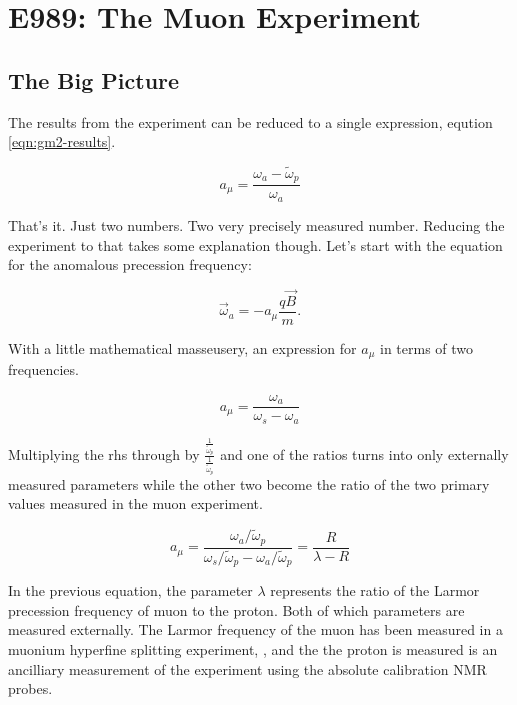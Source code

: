 \chapter {E989: The Muon \gmtwo Experiment}

\section{The Big Picture}

The results from the \gmtwo experiment can be reduced to a single expression, eqution \ref{eqn:gm2-results}.

\begin{equation}
\label{eqn:gm2-results}
a_\mu = \frac{\omega_a - \tilde{\omega}_p}{\omega_a}
\end{equation}

That's it.  Just two numbers. Two very precisely measured number.  Reducing the experiment to that takes some explanation though.  Let's start with the equation for the anomalous precession frequency:

\begin{equation}
\label{eqn:a-mu-precession-0}
\vec{\omega}_a = -a_\mu \frac{q \vec{B}}{m}.
\end{equation}

\noindent
With a little mathematical masseusery, an expression for $a_\mu$ in terms of two frequencies.

\begin{equation}
\label{eqn:a-mu-precession-1}
a_\mu = \frac{\omega_a}{\omega_s - \omega_a}
\end{equation}

\noindent
Multiplying the rhs through by $\frac{\frac{1}{\tilde{\omega}_p}}{\frac{1}{\tilde{\omega}_p}}$ and one of the ratios turns into only externally measured parameters while the other two become the ratio of the two primary values measured in the muon \gmtwo experiment.

\begin{equation}
\label{eqn:a-mu-precession-2}
a_\mu = \frac{\omega_a/\tilde{\omega}_p}{\omega_s/\tilde{\omega}_p - \omega_a/\tilde{\omega}_p} = \frac{R}{\lambda - R}
\end{equation}

\noindent
In the previous equation, the parameter $\lambda$ represents the ratio of the Larmor precession frequency of muon to the proton.  Both of which parameters are measured externally.  The Larmor frequency of the muon has been measured in a muonium hyperfine splitting experiment, , and the the proton is measured is an ancilliary measurement of the \gmtwo experiment using the absolute calibration NMR probes.

